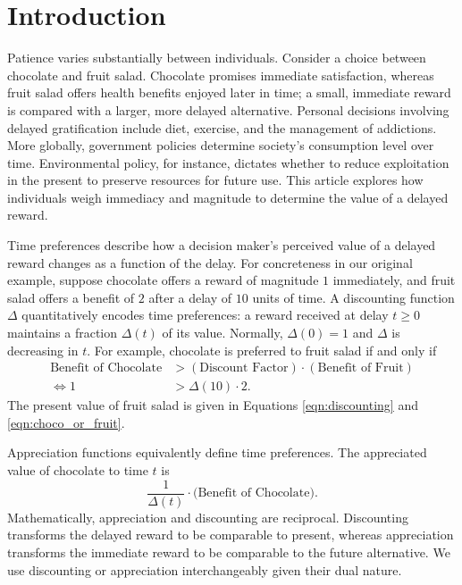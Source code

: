 \documentclass[titlepage, hidelinks, 12pt]{article}
\theoremstyle{plain}
\theoremstyle{remark}
\theoremstyle{definition}
\begin{document}
\linenumbers
\section{Introduction}

Patience varies substantially between individuals. Consider a choice between chocolate and fruit salad.
Chocolate promises immediate satisfaction, whereas fruit salad offers health benefits enjoyed later in time; 
a small, immediate reward is compared with a larger, more delayed alternative. 
Personal decisions involving delayed gratification include diet, exercise, and the management of addictions. 
More globally, government policies determine society's consumption level over time. 
Environmental policy, for instance,
dictates whether to reduce exploitation in the present to preserve resources for future use. 
This article explores how individuals weigh immediacy and magnitude to determine the value of a delayed reward. 

Time preferences describe how a decision maker's perceived value of a delayed reward changes as a function of the delay. 
For concreteness in our original example, suppose chocolate offers a reward of magnitude $1$ immediately, 
and fruit salad offers a benefit of $2$ after a delay of $10$ units of time. 
A discounting function $\Delta$ quantitatively encodes time preferences: a reward received at delay $t\ge0$ maintains a fraction
$\Delta(t)$ of its value. Normally, $\Delta(0) = 1$ and $\Delta$ is decreasing in $t$. 
For example, chocolate is preferred to fruit salad if and only if
\begin{align}
    \text{Benefit of Chocolate} &> (\text{Discount Factor}) \cdot (\text{Benefit of Fruit})  \label{eqn:discounting}\\
    \iff 1 &> \Delta(10) \cdot 2.
    \label{eqn:choco_or_fruit}
\end{align}
The present value of fruit salad is given in Equations \ref{eqn:discounting} and \ref{eqn:choco_or_fruit}.

Appreciation functions equivalently define time preferences. 
The appreciated value of chocolate to time $t$ is 
\begin{equation}
    \frac{1}{\Delta(t)} \cdot \text{(Benefit of Chocolate)}. 
    \label{eqn:appreciation}
\end{equation}
Mathematically, appreciation and discounting are reciprocal. Discounting transforms the delayed reward to be comparable to present, whereas
appreciation transforms the immediate reward to be comparable to the future alternative. 
We use discounting or appreciation interchangeably given their dual nature. 
\end{document}
